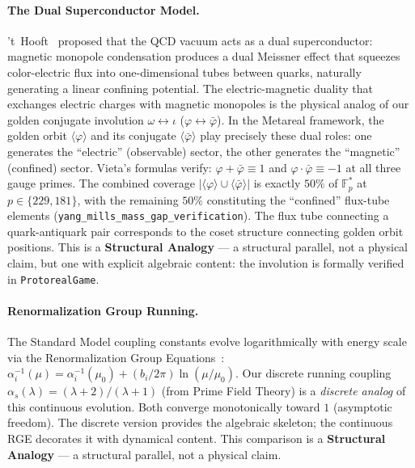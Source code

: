 \paragraph{The Dual Superconductor Model.}
't~Hooft~\cite{thooft1981} proposed that the QCD vacuum acts as a dual superconductor: magnetic monopole condensation produces a dual Meissner effect that squeezes color-electric flux into one-dimensional tubes between quarks, naturally generating a linear confining potential. The electric-magnetic duality that exchanges electric charges with magnetic monopoles is the physical analog of our golden conjugate involution $\omega \leftrightarrow \iota$ ($\varphi \leftrightarrow \bar\varphi$). In the Metareal framework, the golden orbit $\langle\varphi\rangle$ and its conjugate $\langle\bar\varphi\rangle$ play precisely these dual roles: one generates the ``electric'' (observable) sector, the other generates the ``magnetic'' (confined) sector. Vieta's formulas verify: $\varphi + \bar\varphi \equiv 1$ and $\varphi \cdot \bar\varphi \equiv -1$ at all three gauge primes. The combined coverage $|\langle\varphi\rangle \cup \langle\bar\varphi\rangle|$ is exactly $50\%$ of $\mathbb{F}_p^*$ at $p \in \{229, 181\}$, with the remaining $50\%$ constituting the ``confined'' flux-tube elements (\texttt{yang\_mills\_mass\_gap\_verification}). The flux tube connecting a quark-antiquark pair corresponds to the coset structure connecting golden orbit positions. This is a \textbf{Structural Analogy} --- a structural parallel, not a physical claim, but one with explicit algebraic content: the involution is formally verified in \texttt{ProtorealGame}.

\paragraph{Renormalization Group Running.}
The Standard Model coupling constants evolve logarithmically with energy scale via the Renormalization Group Equations~\cite{wilczek1973}: $\alpha_i^{-1}(\mu) = \alpha_i^{-1}(\mu_0) + (b_i / 2\pi) \ln(\mu/\mu_0)$. Our discrete running coupling $\alpha_s(\lambda) = (\lambda + 2)/(\lambda + 1)$ (from Prime Field Theory) is a \emph{discrete analog} of this continuous evolution. Both converge monotonically toward $1$ (asymptotic freedom). The discrete version provides the algebraic skeleton; the continuous RGE decorates it with dynamical content. This comparison is a \textbf{Structural Analogy} --- a structural parallel, not a physical claim.

